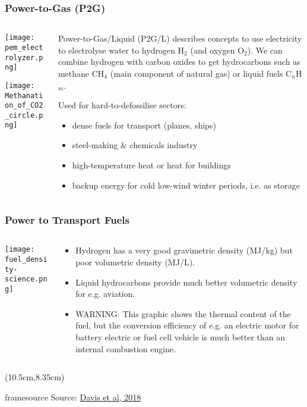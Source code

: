 \documentclass[10pt,aspectratio=169,dvipsnames]{beamer}
\newcommand{\source}[1]{\begin{textblock*}{5cm}(10.5cm,8.35cm)
    \begin{beamercolorbox}[ht=0.5cm,right]{framesource}
        \usebeamerfont{framesource}\usebeamercolor[fg]{framesource} Source: {#1}
    \end{beamercolorbox}
\end{textblock*}}
\let\olditem\item
\renewcommand{\item}{%
\olditem\vspace{5pt}}
\begin{document}
\begin{frame}
  \frametitle{Power-to-Gas (P2G)}

  \begin{columns}[T]
    \begin{column}{4cm}
      \texttt{[image: pem\_electrolyzer.png]}


      \vspace{.4cm}

      \texttt{[image: Methanation\_of\_CO2\_circle.png]}
    \end{column}
    \begin{column}{7cm}

      Power-to-Gas/Liquid (P2G/L) describes concepts to use electricity to
      electrolyse water to \alert{hydrogen} H$_2$ (and oxygen O$_2$).
      We can combine hydrogen with carbon oxides to get
      \alert{hydrocarbons} such as methane CH$_4$ (main component of
      natural gas) or liquid fuels C$_n$H$_m$.

      Used for \alert{hard-to-defossilise sectors}:
            \begin{itemize}
            \item
              \alert{dense fuels} for transport (planes, ships)
            \item \alert{steel-making} \& \alert{chemicals industry}
              \item \alert{high-temperature heat} or \alert{heat for buildings}
                \item \alert{backup energy} for cold low-wind winter periods, i.e. as storage
            \end{itemize}
    \end{column}
  \end{columns}

\end{frame}
\begin{frame}
  \frametitle{Power to Transport Fuels}

    \begin{columns}[T]
    \begin{column}{7cm}
      \texttt{[image: fuel\_density-science.png]}
    \end{column}
    \begin{column}{7cm}
      \begin{itemize}
      \item  Hydrogen has a very good gravimetric density (MJ/kg) but poor volumetric density (MJ/L).
      \item      Liquid hydrocarbons provide much better volumetric density for e.g. aviation.
      \item    WARNING: This graphic shows the thermal content of the fuel, but the \alert{conversion efficiency} of e.g. an electric motor for battery electric or fuel cell vehicle is much better than an internal combustion engine.
      \end{itemize}
      \end{column}
    \end{columns}
    \source{\href{https://doi.org/10.1126/science.aas9793}{Davis et al, 2018}}
\end{frame}
\end{document}
